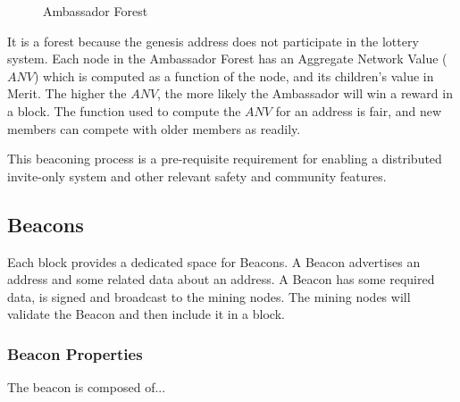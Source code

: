 \documentclass{article}
\begin{document}
\begin{figure}[H]
    \begin{center}
    \end{center}
    \caption{Ambassador Forest}

\end{figure}

It is a forest because the \gls{genesis address} does not participate in the lottery
system. Each node in the Ambassador Forest has an Aggregate Network Value ($ANV$)
which is computed as a function of the node, and its children's value in Merit.
The higher the $ANV$, the more likely the Ambassador will win a reward in a block.
The function used to compute the $ANV$ for an address is fair, and new members
can compete with older members as readily.

This beaconing process is a pre-requisite requirement for enabling a
distributed invite-only system and other relevant safety and community features.

\subsection{Beacons}

Each block provides a dedicated space for Beacons. A Beacon advertises an address
and some related data about an address. A Beacon has some required data,
is signed and broadcast to the mining nodes. The mining nodes will validate
the Beacon and then include it in a block.

\subsubsection{Beacon Properties}
The beacon is composed of...
\end{document}

